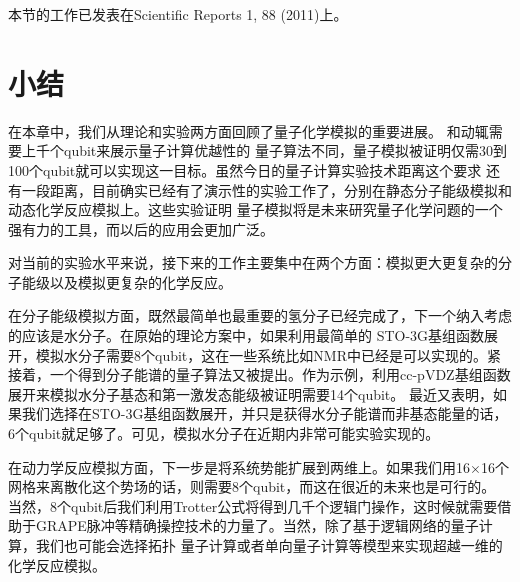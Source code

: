  本节的工作已发表在Scientific Reports 1, 88 (2011)\cite{yexiao}上。

\section{小结}

在本章中，我们从理论和实验两方面回顾了量子化学模拟的重要进展。 和动辄需要上千个qubit来展示量子计算优越性的
量子算法不同，量子模拟被证明仅需30到100个qubit就可以实现这一目标。虽然今日的量子计算实验技术距离这个要求
还有一段距离，目前确实已经有了演示性的实验工作了，分别在静态分子能级模拟\cite{optics_static,static}和动态化学反应模拟\cite{dynamical}上。这些实验证明
量子模拟将是未来研究量子化学问题的一个强有力的工具，而以后的应用会更加广泛。

对当前的实验水平来说，接下来的工作主要集中在两个方面：模拟更大更复杂的分子能级以及模拟更复杂的化学反应。

在分子能级模拟方面，既然最简单也最重要的氢分子已经完成了，下一个纳入考虑的应该是水分子。在原始的理论方案中\cite{Alan_first}，如果利用最简单的
STO-3G基组函数展开，模拟水分子需要8个qubit，这在一些系统比如NMR中已经是可以实现的。紧接着，一个得到分子能谱的量子算法又被提出\cite{watermo1}。作为示例，利用cc-pVDZ基组函数展开来模拟水分子基态和第一激发态能级被证明需要14个qubit。
最近又表明，如果我们选择在STO-3G基组函数展开，并只是获得水分子能谱而非基态能量的话，6个qubit就足够了\cite{watermo2}。可见，模拟水分子在近期内非常可能实验实现的。

在动力学反应模拟方面，下一步是将系统势能扩展到两维上。如果我们用16$\times$16个网格来离散化这个势场的话，则需要8个qubit，而这在很近的未来也是可行的。
当然，8个qubit后我们利用Trotter公式将得到几千个逻辑门操作，这时候就需要借助于GRAPE脉冲等精确操控技术的力量了。当然，除了基于逻辑网络的量子计算，我们也可能会选择拓扑
量子计算\cite{dymtopo}或者单向量子计算\cite{oneway1,dymoneway}等模型来实现超越一维的化学反应模拟。